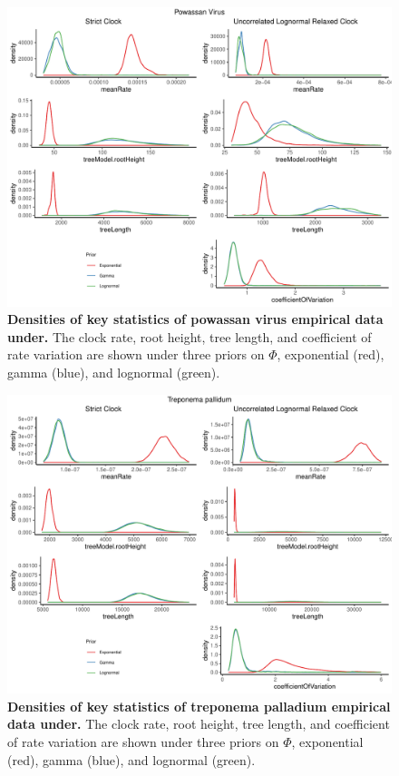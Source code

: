 \documentclass[10pt,letterpaper]{article}
\begin{document}
\begin{figure}[!h]
	\begin{center}
		\includegraphics[width=13cm]{sandbox_figures/powv_density_plot.pdf}\newline
		\vspace{-0.5cm}
		\caption{\textbf{Densities of key statistics of powassan virus empirical data under.} The clock rate, root height, tree length, and coefficient of rate variation are shown under three priors on $\Phi$, exponential (red), gamma (blue), and lognormal (green).}
	\end{center}
\end{figure}
\begin{figure}[!h]
	\begin{center}
		\includegraphics[width=13cm]{sandbox_figures/treponema_density_plot.pdf}\newline
		\vspace{-0.5cm}
		\caption{\textbf{Densities of key statistics of treponema palladium empirical data under.} The clock rate, root height, tree length, and coefficient of rate variation are shown under three priors on $\Phi$, exponential (red), gamma (blue), and lognormal (green).}
	\end{center}
\end{figure}
\end{document}

